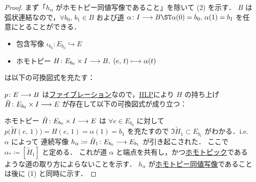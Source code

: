 \documentclass[algtopo_main]{subfiles}
\begin{document}
\begin{proof}
    まず「$h_\alpha$ がホモトピー同値写像であること」を除いて (2) を示す．
    $B$ は弧状連結なので，$\forall b_0,\, b_1 \in B$ および\hyperref[def:path-basic]{道} $\alpha \colon I \lto B \ST \alpha(0) = b_0,\, \alpha(1) = b_1$ を任意にとることができる．
    \begin{itemize}
        \item 包含写像 $\iota_{b_0} \colon E_{b_0} \hookrightarrow E$ 
        \item ホモトピー $H \colon E_{b_0} \times I \longrightarrow B,\; (e,\, t) \longmapsto \alpha(t)$
    \end{itemize}
    は以下の可換図式を充たす：
    \begin{center}
    \end{center}
    $p \colon E \longrightarrow B$ は\hyperref[def:fibration]{ファイブレーション}なので，\hyperref[def:HLP]{HLP}により
    $H$ の持ち上げ $\tilde{H} \colon E_{b_0} \times I \longrightarrow E$ が存在して以下の可換図式が成り立つ：
    \begin{center}
    \end{center}
    ホモトピー $\tilde{H} \colon E_{b_0} \times I \longrightarrow E$ は $\forall e \in E_{b_0}$ に対して
    $p \bigl(\tilde{H}(e,\, 1)\bigr) = H(e,\, 1) = \alpha(1) = b_1$ を充たすので $\Im \tilde{H}_1 \subset E_{b_1}$ がわかる．i.e. $\alpha$ によって
    連続写像 $h_\alpha \coloneqq \tilde{H}_1 \colon E_{b_0} \longrightarrow E_{b_1}$ が引き起こされた．
    ここで $\alpha_* \coloneqq [\tilde{H}_1]$ と定める．
    これが道 $\alpha$ と端点を共有し，かつ\hyperref[def:homotopy-basic]{ホモトピック}であるような道の取り方によらないことを示す．
    $h_\alpha$ が\hyperref[def:homotopy-basic]{ホモトピー同値写像}であることは後に (1) と同時に示す．
    

\end{proof}
\end{document}
